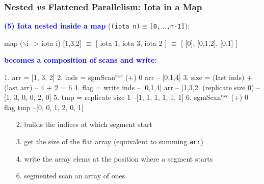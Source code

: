 \documentclass{beamer}
\newcommand{\blue}[1]{\textcolor{Blue}{{#1}}}
\renewcommand{\emph}[1]{\textcolor{structure}{#1}}
\newcommand{\emp}[1]{\textcolor{DikuRed}{ #1}}
\newcommand{\mymath}[1]{$ #1 $}
\newcommand{\myindu}[1]{^{#1}}
\begin{document}
\begin{frame}[fragile,t]
  \frametitle{Nested {\it vs} Flattened Parallelism: Iota in a Map}

\blue{\bf (5) Iota nested inside a map} ({\tt (iota n)$\equiv$[0,$\ldots$,n-1]}): 

\begin{colorcode}[fontsize=\scriptsize]
map (\mymath{\backslash}i -> iota i) \emp{[1,3,2]} \mymath{\equiv}
[ iota 1, iota 3, iota 2 ] \mymath{\equiv} [ [0], [0,1,2], [0,1] ]
\end{colorcode}

\bigskip
\pause

\blue{\bf becomes a composition of scans and write:}
\bigskip

\begin{colorcode}[fontsize=\scriptsize]
1. arr  = [1, 3, 2]
2. inds = sgmScan\mymath{\myindu{exc}} (+) 0 arr      -- [0,1,4]
3. size = (last inds) + (last arr) -- 4 + 2 = 6
4. flag = write inds  -- \emp{[0,1,4]}
                arr   -- \emp{[1,3,2]}
                (replicate size 0)
--              [1, 3, 0, 0, 2, 0]
5. \emp{tmp  = replicate size 1  --[1, 1, 1, 1, 1, 1]}
6. sgmScan\mymath{\myindu{exc}} (+) 0 flag \emp{tmp} \emph{--[0, 0, 1, 2, 0, 1]}
\end{colorcode}

\bigskip

\begin{itemize}
    \item[2.] builds the indices at which segment start
    \item[3.] get the size of the flat array (equivalent to summing {\tt arr})
    \item[4.] write the array elems at the position where a segment starts
    \item[6.] \emp{segmented scan an array of ones}.
\end{itemize}

\end{frame}
\end{document}

